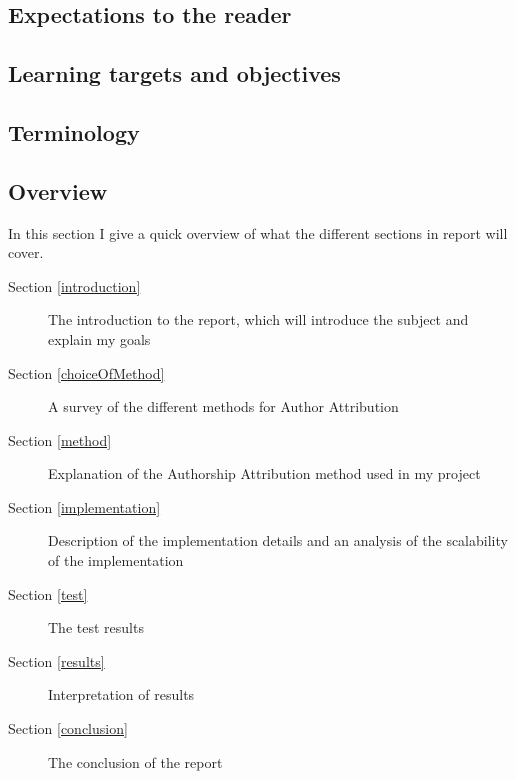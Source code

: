 \subsection{Expectations to the reader}
\label{expectations}

\subsection{Learning targets and objectives}
\label{learning}

\subsection{Terminology}

\subsection{Overview}

In this section I give a quick overview of what the different sections in report will cover.
\begin{description}
\item[Section \ref{introduction}] The introduction to the report, which will introduce the subject and explain my goals
\item[Section \ref{choiceOfMethod}] A survey of the different methods for Author Attribution  
\item[Section \ref{method}] Explanation of the Authorship Attribution method used in my project
\item[Section \ref{implementation}] Description of the implementation details and an analysis of the scalability of the implementation
\item[Section \ref{test}] The test results
\item[Section \ref{results}] Interpretation of results
\item[Section \ref{conclusion}] The conclusion of the report  
\end{description}
